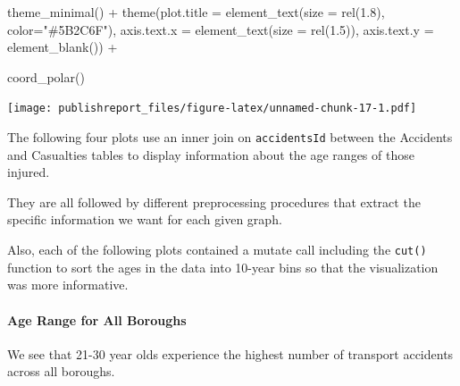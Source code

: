 \documentclass[
]{article}
\newenvironment{Shaded}{\begin{snugshade}}{\end{snugshade}}
\newcommand{\AttributeTok}[1]{\textcolor[rgb]{0.77,0.63,0.00}{#1}}
\newcommand{\FloatTok}[1]{\textcolor[rgb]{0.00,0.00,0.81}{#1}}
\newcommand{\FunctionTok}[1]{\textcolor[rgb]{0.00,0.00,0.00}{#1}}
\newcommand{\NormalTok}[1]{#1}
\newcommand{\SpecialCharTok}[1]{\textcolor[rgb]{0.00,0.00,0.00}{#1}}
\newcommand{\StringTok}[1]{\textcolor[rgb]{0.31,0.60,0.02}{#1}}
\begin{document}
\begin{Shaded}
\begin{Highlighting}[]
    \FunctionTok{theme\_minimal}\NormalTok{() }\SpecialCharTok{+}
    \FunctionTok{theme}\NormalTok{(}\AttributeTok{plot.title =} \FunctionTok{element\_text}\NormalTok{(}\AttributeTok{size =} \FunctionTok{rel}\NormalTok{(}\FloatTok{1.8}\NormalTok{),}
                                    \AttributeTok{color=}\StringTok{"\#5B2C6F"}\NormalTok{),}
          \AttributeTok{axis.text.x =} \FunctionTok{element\_text}\NormalTok{(}\AttributeTok{size =} \FunctionTok{rel}\NormalTok{(}\FloatTok{1.5}\NormalTok{)),}
          \AttributeTok{axis.text.y =} \FunctionTok{element\_blank}\NormalTok{()) }\SpecialCharTok{+}
    
    \FunctionTok{coord\_polar}\NormalTok{() }
\end{Highlighting}
\end{Shaded}

\texttt{[image: publishreport\_files/figure-latex/unnamed-chunk-17-1.pdf]}

The following four plots use an inner join on \texttt{accidentsId}
between the Accidents and Casualties tables to display information about
the age ranges of those injured.

They are all followed by different preprocessing procedures that extract
the specific information we want for each given graph.

Also, each of the following plots contained a mutate call including the
\texttt{cut()} function to sort the ages in the data into 10-year bins
so that the visualization was more informative.

\hypertarget{age-range-for-all-boroughs}{%
\paragraph{Age Range for All
Boroughs}\label{age-range-for-all-boroughs}}

We see that 21-30 year olds experience the highest number of transport
accidents across all boroughs.
\end{document}
